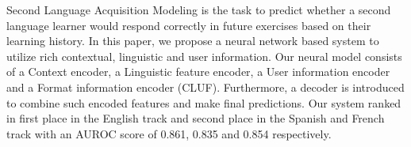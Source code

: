 Second Language Acquisition Modeling is the task to predict whether a second language learner would respond correctly in future exercises based on their learning history. In this paper, we propose a neural network based system to utilize rich contextual, linguistic and user information. Our neural model consists of a Context encoder, a Linguistic feature encoder, a User information encoder and a Format information encoder (CLUF). Furthermore, a decoder is introduced to combine such encoded features and make final predictions. Our system ranked in first place in the English track and second place in the Spanish and French track with an AUROC score of 0.861, 0.835 and 0.854 respectively.
